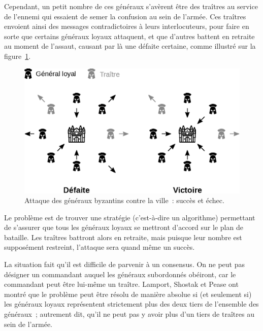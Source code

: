 Cependant, un petit nombre de ces généraux s'avèrent être des traîtres au service de l'ennemi qui essaient de semer la confusion au sein de l'armée. Ces traîtres envoient ainsi des messages contradictoires à leurs interlocuteurs, pour faire en sorte que certains généraux loyaux attaquent, et que d'autres battent en retraite au moment de l'assaut, causant par là une défaite certaine, comme illustré sur la figure~\ref{fig:byzantine-generals-attack}.

\begin{figure}[h]
  \centering
  \includegraphics[scale=0.7]{img/byzantine-generals-attack.eps}
  \caption{Attaque des généraux byzantins contre la ville~: succès et échec.}
  \label{fig:byzantine-generals-attack}
\end{figure}

Le problème est de trouver une stratégie (c'est-à-dire un algorithme) permettant de s'assurer que tous les généraux loyaux se mettront d'accord sur le plan de bataille. Les traîtres battront alors en retraite, mais puisque leur nombre est supposément restreint, l'attaque sera quand même un succès.

La situation fait qu'il est difficile de parvenir à un consensus. On ne peut pas désigner un commandant auquel les généraux subordonnés obéiront, car le commandant peut être lui-même un traître. Lamport, Shostak et Pease ont montré que le problème peut être résolu de manière absolue si (et seulement si) les généraux loyaux représentent strictement plus des deux tiers de l'ensemble des généraux~; autrement dit, qu'il ne peut pas y avoir plus d'un tiers de traîtres au sein de l'armée.

